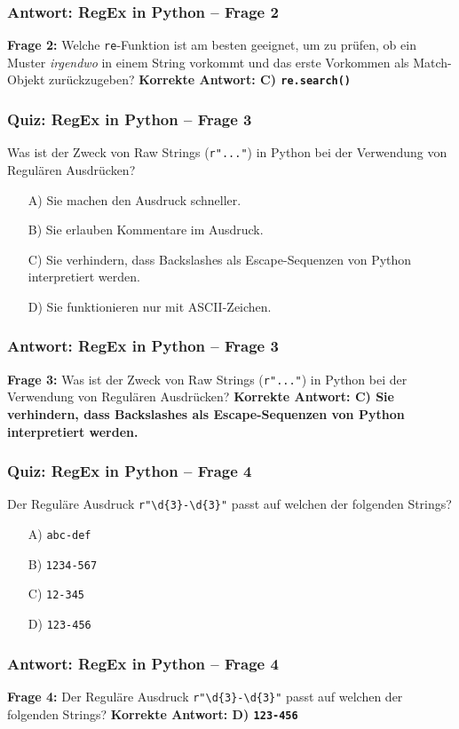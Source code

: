 \documentclass[aspectratio=169]{beamer} %
\begin{document}
\begin{frame}[fragile]
\frametitle{Antwort: RegEx in Python – Frage 2}
\textbf{Frage 2:} Welche \texttt{re}-Funktion ist am besten geeignet, um zu prüfen, ob ein Muster \textit{irgendwo} in einem String vorkommt und das erste Vorkommen als Match-Objekt zurückzugeben?
\vspace{1em}
\textbf{Korrekte Antwort: C) \texttt{re.search()}}
\end{frame}

\begin{frame}[fragile]
\frametitle{Quiz: RegEx in Python – Frage 3}
Was ist der Zweck von Raw Strings (\texttt{r"..."}) in Python bei der Verwendung von Regulären Ausdrücken?
\begin{enumerate}
    \item[A)] Sie machen den Ausdruck schneller.
    \item[B)] Sie erlauben Kommentare im Ausdruck.
    \item[C)] Sie verhindern, dass Backslashes als Escape-Sequenzen von Python interpretiert werden.
    \item[D)] Sie funktionieren nur mit ASCII-Zeichen.
\end{enumerate}
\end{frame}

\begin{frame}[fragile]
\frametitle{Antwort: RegEx in Python – Frage 3}
\textbf{Frage 3:} Was ist der Zweck von Raw Strings (\texttt{r"..."}) in Python bei der Verwendung von Regulären Ausdrücken?
\vspace{1em}
\textbf{Korrekte Antwort: C) Sie verhindern, dass Backslashes als Escape-Sequenzen von Python interpretiert werden.}
\end{frame}

\begin{frame}[fragile]
\frametitle{Quiz: RegEx in Python – Frage 4}
Der Reguläre Ausdruck \texttt{r"\textbackslash{}d\{3\}-\textbackslash{}d\{3\}"} passt auf welchen der folgenden Strings?
\begin{enumerate}
    \item[A)] \texttt{abc-def}
    \item[B)] \texttt{1234-567}
    \item[C)] \texttt{12-345}
    \item[D)] \texttt{123-456}
\end{enumerate}
\end{frame}

\begin{frame}[fragile]
\frametitle{Antwort: RegEx in Python – Frage 4}
\textbf{Frage 4:} Der Reguläre Ausdruck \texttt{r"\textbackslash{}d\{3\}-\textbackslash{}d\{3\}"} passt auf welchen der folgenden Strings?
\vspace{1em}
\textbf{Korrekte Antwort: D) \texttt{123-456}}
\end{frame}
\end{document}
